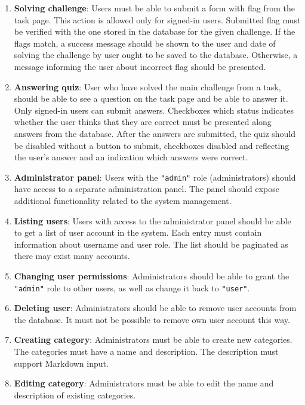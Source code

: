 \begin{enumerate}
	\item \textbf{Solving challenge}: Users must be able to submit a form with flag from the task page. This action is allowed only for signed-in users. Submitted flag must be verified with the one stored in the database for the given challenge. If the flags match, a success message should be shown to the user and date of solving the challenge by user ought to be saved to the database. Otherwise, a message informing the user about incorrect flag should be presented.

	\item \textbf{Answering quiz}: User who have solved the main challenge from a task, should be able to see a question on the task page and be able to answer it. Only signed-in users can submit answers. Checkboxes which status indicates whether the user thinks that they are correct must be presented along answers from the database. After the answers are submitted, the quiz should be disabled without a button to submit, checkboxes disabled and reflecting the user's answer and an indication which answers were correct.

	\item \textbf{Administrator panel}: Users with the \texttt{"admin"} role (administrators) should have access to a separate administration panel. The panel should expose additional functionality related to the system management.

	\item \textbf{Listing users}: Users with access to the administrator panel should be able to get a list of user account in the system. Each entry must contain information about username and user role. The list should be paginated as there may exist many accounts.

	\item \textbf{Changing user permissions}: Administrators should be able to grant the \texttt{"admin"} role to other users, as well as change it back to \texttt{"user"}.

	\item \textbf{Deleting user}: Administrators should be able to remove user accounts from the database. It must not be possible to remove own user account this way.

	\item \textbf{Creating category}: Administrators must be able to create new categories. The categories must have a name and description. The description must support Markdown input.

	\item \textbf{Editing category}: Administrators must be able to edit the name and description of existing categories.


\end{enumerate}
